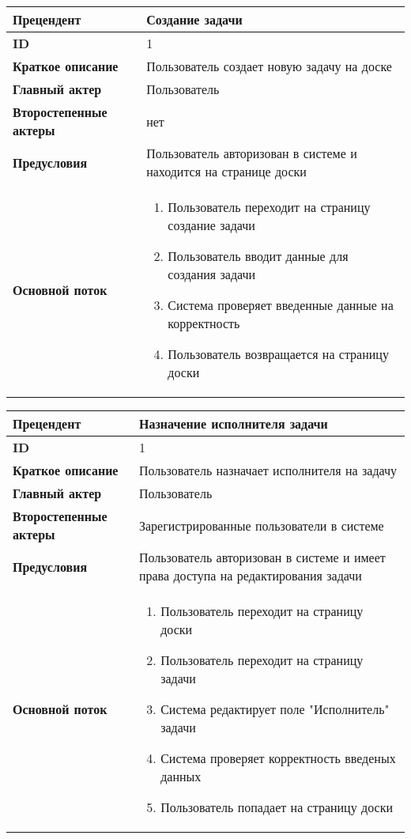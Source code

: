 \documentclass{article}
\begin{document}
\begin{center}
\begin{tabular}{|l|p{9cm}|}
  \hline
  \textbf{Прецендент} & Создание задачи \\
  \hline
  \textbf{ID} & 1 \\
  \hline
  \textbf{Краткое описание} & Пользователь создает новую задачу на доске \\
  \hline
  \textbf{Главный актер} & Пользователь\\
  \hline
  \textbf{Второстепенные актеры} & нет \\
  \hline
  \textbf{Предусловия} &  Пользователь авторизован в системе и находится на странице доски\\
  \hline
  \textbf{Основной поток} & \begin{enumerate}
    \item Пользователь переходит на страницу создание задачи
    \item Пользователь вводит данные для создания задачи
    \item Система проверяет введенные данные на корректность
    \item Пользователь возвращается на страницу доски
  \end{enumerate} \\
  \hline
\end{tabular} 
\end{center}

\begin{tabular}{|l|p{9cm}|}
  \hline
  \textbf{Прецендент} & Назначение исполнителя задачи \\
  \hline
  \textbf{ID} & 1 \\
  \hline
  \textbf{Краткое описание} & Пользователь назначает исполнителя на задачу \\
  \hline
  \textbf{Главный актер} & Пользователь\\
  \hline
  \textbf{Второстепенные актеры} & Зарегистрированные пользователи в системе \\
  \hline
  \textbf{Предусловия} &  Пользователь авторизован в системе и имеет права доступа на редактирования задачи\\
  \hline
  \textbf{Основной поток} & \begin{enumerate}
    \item Пользователь переходит на страницу доски
    \item Пользователь переходит на страницу задачи
    \item Система редактирует поле "Исполнитель" задачи
    \item Система проверяет корректность введеных данных
    \item Пользователь попадает на страницу доски
  \end{enumerate} \\
  \hline
\end{tabular}
\end{document}
